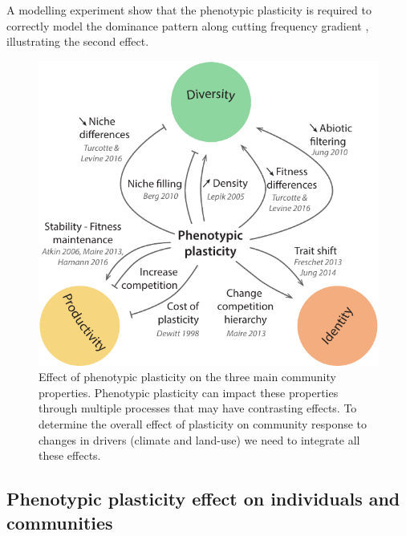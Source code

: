 A modelling experiment show that the phenotypic plasticity is required to correctly model the dominance pattern along cutting frequency gradient \parencite{maire_plasticity_2013}, illustrating the second effect. 




\begin{figure}
    \includegraphics{./1_Introduction/graphics/effect_plasticity.pdf}
  \caption[Phenotypic plasticity effect on community properties]{Effect of phenotypic plasticity on the three main community properties. Phenotypic plasticity can impact these properties through multiple processes that may have contrasting effects. To determine the overall effect of plasticity on community response to changes in drivers (climate and land-use) we need to integrate all these effects.}
  \label{fig:plasticity-effect}
\end{figure}

\subsection{Phenotypic plasticity effect on individuals and communities}

